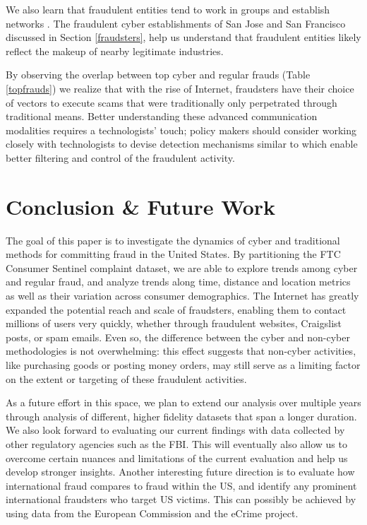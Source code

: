 \documentclass[conference]{IEEEtran}
\begin{document}
We also learn that fraudulent entities tend to work in groups and establish networks \cite{buffalodebt2}. The fraudulent cyber establishments of San Jose and San Francisco discussed in Section \ref{fraudsters}, help us understand that fraudulent entities likely reflect the makeup of nearby legitimate industries.  

By observing the overlap between top cyber and regular frauds (Table \ref{topfrauds}) we realize that with the rise of Internet, fraudsters have their choice of vectors to execute scams that were traditionally only perpetrated through traditional means. Better understanding these advanced communication modalities requires a technologists' touch;  policy makers should consider working closely with technologists to devise detection mechanisms similar to \cite{brause1999neural, moreau1997detection} which enable better filtering and control of the fraudulent activity.

\section{Conclusion \& Future Work}\label{conclusion}

The goal of this paper is to investigate the dynamics of cyber and traditional
methods for committing fraud in the United States. By partitioning the FTC
Consumer Sentinel complaint dataset, we are able to explore trends among cyber
and regular fraud, and analyze trends along time, distance and location metrics
as well as their variation across consumer demographics. The Internet has
greatly expanded the potential reach and scale of fraudsters, enabling them
to contact millions of users very quickly, whether through fraudulent websites,
Craigslist posts, or spam emails. Even so, the difference between the cyber and
non-cyber methodologies is not overwhelming: this effect suggests that
non-cyber activities, like purchasing goods or posting money orders, may still
serve as a limiting factor on the extent or targeting of these fraudulent
activities.

As a future effort in this space, we plan to extend our analysis over multiple
years through analysis of different, higher fidelity datasets that span a
longer duration. We also look forward to evaluating our current findings with
data collected by other regulatory agencies such as the FBI. This will
eventually also allow us to overcome certain nuances and limitations of the
current evaluation and help us develop stronger insights. Another interesting
future direction is to evaluate how international fraud compares to fraud
within the US, and identify any prominent international fraudsters who target
US victims. This can possibly be achieved by using data from the European
Commission and the eCrime project.
\end{document}
